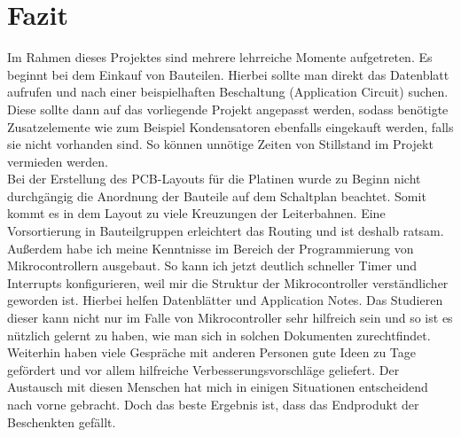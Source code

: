 \documentclass[journal, a4paper]{IEEEtran}
\begin{document}
\section{Fazit}
Im Rahmen dieses Projektes sind mehrere lehrreiche Momente aufgetreten. Es beginnt bei dem Einkauf von Bauteilen. Hierbei sollte man direkt das Datenblatt aufrufen und nach einer beispielhaften Beschaltung (Application Circuit) suchen. Diese sollte dann auf das vorliegende Projekt angepasst werden, sodass benötigte Zusatzelemente wie zum Beispiel Kondensatoren ebenfalls eingekauft werden, falls sie nicht vorhanden sind. So können unnötige Zeiten von Stillstand im Projekt vermieden werden.\\
Bei der Erstellung des PCB-Layouts für die Platinen wurde zu Beginn nicht durchgängig die Anordnung der Bauteile auf dem Schaltplan beachtet. Somit kommt es in dem Layout zu viele Kreuzungen der Leiterbahnen. Eine Vorsortierung in Bauteilgruppen erleichtert das Routing und ist deshalb ratsam.\\
Außerdem habe ich meine Kenntnisse im Bereich der Programmierung von Mikrocontrollern ausgebaut. So kann ich jetzt deutlich schneller Timer und Interrupts konfigurieren, weil mir die Struktur der Mikrocontroller verständlicher geworden ist. Hierbei helfen Datenblätter und Application Notes. Das Studieren dieser kann nicht nur im Falle von Mikrocontroller sehr hilfreich sein und so ist es nützlich gelernt zu haben, wie man sich in solchen Dokumenten zurechtfindet.\\
Weiterhin haben viele Gespräche mit anderen Personen gute Ideen zu Tage gefördert und vor allem hilfreiche Verbesserungsvorschläge geliefert. Der Austausch mit diesen Menschen hat mich in einigen Situationen entscheidend nach vorne gebracht.  
Doch das beste Ergebnis ist, dass das Endprodukt der Beschenkten gefällt.




\end{document}
